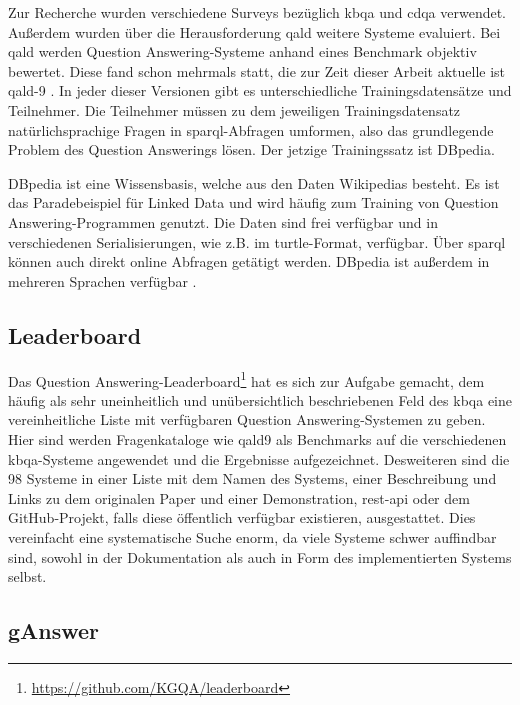 Zur Recherche wurden verschiedene Surveys bezüglich \ac{kbqa} und \ac{cdqa} verwendet.
Außerdem wurden über die Herausforderung \ac{qald} weitere Systeme evaluiert.
Bei \ac{qald} werden Question Answering-Systeme anhand eines Benchmark objektiv bewertet.
Diese fand schon mehrmals statt, die zur Zeit dieser Arbeit aktuelle ist \ac{qald}-9 \citep{qald9}.
In jeder dieser Versionen gibt es unterschiedliche Trainingsdatensätze und Teilnehmer.
Die Teilnehmer müssen zu dem jeweiligen Trainingsdatensatz natürlichsprachige Fragen in \ac{sparql}-Abfragen umformen, also das grundlegende Problem des Question Answerings lösen.
Der jetzige Trainingssatz ist DBpedia.

DBpedia ist eine Wissensbasis, welche aus den Daten Wikipedias besteht.
Es ist das Paradebeispiel für Linked Data und wird häufig zum Training von Question Answering-Programmen genutzt.
Die Daten sind frei verfügbar und in verschiedenen Serialisierungen, wie z.B. im \ac{turtle}-Format, verfügbar.
Über \ac{sparql} können auch direkt online Abfragen getätigt werden.
DBpedia ist außerdem in mehreren Sprachen verfügbar \citep{dbpedia}.

\subsection{Leaderboard}

Das Question Answering-Leaderboard\footnote{\url{https://github.com/KGQA/leaderboard}} \citep{kgqaleaderboard} hat es sich zur Aufgabe gemacht,
dem häufig als sehr uneinheitlich und unübersichtlich \citep{diefenbachkbqa} beschriebenen Feld des \ac{kbqa} eine vereinheitliche Liste mit verfügbaren Question Answering-Systemen zu geben.
Hier sind werden Fragenkataloge wie \ac{qald9} als Benchmarks auf die verschiedenen \ac{kbqa}-Systeme angewendet und die Ergebnisse aufgezeichnet.
Desweiteren sind die 98 Systeme in einer Liste mit dem Namen des Systems, einer Beschreibung und Links zu dem originalen Paper und einer Demonstration,
\ac{rest}-\ac{api} oder dem GitHub-Projekt, falls diese öffentlich verfügbar existieren, ausgestattet.
Dies vereinfacht eine systematische Suche enorm, da viele Systeme schwer auffindbar sind, sowohl in der Dokumentation als auch in Form des implementierten Systems selbst.

\subsection{gAnswer}

